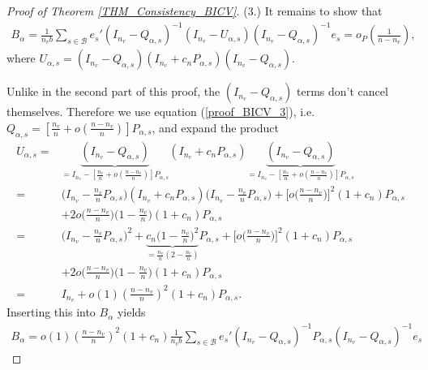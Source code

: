 \documentclass[Research_Module_ES.tex]{subfiles}
\begin{document}
\begin{proof}[Proof of Theorem \ref{THM_Consistency_BICV}]
	(3.) It remains to show that  
	\begin{align*}
	B_\alpha
	=\frac{1}{n_vb}\sum_{s\in \mathcal{B}}e_s'(I_{n_v}-Q_{\alpha,s})^{-1}(I_{n_v}-U_{\alpha,s})(I_{n_v}-Q_{\alpha,s})^{-1}e_s
	= o_P\left(\frac{1}{n-n_v}\right),
	\end{align*}
	where $U_{\alpha,s} = (I_{n_v}-Q_{\alpha,s})(I_{n_v}+c_n P_{\alpha,s})(I_{n_v}-Q_{\alpha,s})$.
	
	Unlike in the second part of this proof, the $(I_{n_v}-Q_{\alpha,s})$ terms don't cancel themselves. 
	Therefore we use equation (\ref{proof_BICV_3}), i.e. $Q_{\alpha,s} = \left[\frac{n_v}{n}+o\left(\frac{n-n_v}{n}\right)\right] P_{\alpha,s}$, and expand the product 
	\begin{align*}
	U_{\alpha,s} 
	=& \underbrace{(I_{n_v}-Q_{\alpha,s})}_{=I_{n_v}-[\frac{n_v}{n}+o(\frac{n-n_v}{n})]P_{\alpha,s}}(I_{n_v}+c_n P_{\alpha,s})\underbrace{(I_{n_v}-Q_{\alpha,s})}_{=I_{n_v}-[\frac{n_v}{n}+o(\frac{n-n_v}{n})]P_{\alpha,s}}\\
	=&\biggl(I_{n_v}-\frac{n_v}{n}P_{\alpha,s}\biggr)(I_{n_v}+c_n P_{\alpha,s})\biggl(I_{n_v}-\frac{n_v}{n}P_{\alpha,s}\biggr)
	+\biggl[o\biggl(\frac{n-n_v}{n}\biggr)\biggr]^2(1+c_n)P_{\alpha,s} \\
	&+ 2o\biggl(\frac{n-n_v}{n}\biggr)\biggl(1-\frac{n_v}{n}\biggr)(1+c_n)P_{\alpha,s}\\
	=&\biggl(I_{n_v}-\frac{n_v}{n}P_{\alpha,s}\biggr)^2+\underbrace{c_n\biggl(1-\frac{n_v}{n}\biggr)^2}_{=\frac{n_v}{n}(2-\frac{n_v}{n})}P_{\alpha,s}+\biggl[o\biggl(\frac{n-n_v}{n}\biggr)\biggr]^2(1+c_n)P_{\alpha,s}\\
	&+ 2o\biggl(\frac{n-n_v}{n}\biggr)\biggl(1-\frac{n_v}{n}\biggr)(1+c_n)P_{\alpha,s}\\
	=&I_{n_v} +o(1)\left(\frac{n-n_v}{n}\right)^2(1+c_n)P_{\alpha,s}.
	\end{align*}
	Inserting this into $B_\alpha$ yields
	\begin{align}
	B_\alpha
	=o(1)\left(\frac{n-n_v}{n}\right)^2(1+c_n)\frac{1}{n_vb}\sum_{s\in \mathcal{B}}e_s'(I_{n_v}-Q_{\alpha,s})^{-1}P_{\alpha,s}(I_{n_v}-Q_{\alpha,s})^{-1}e_s\label{proof_BICV_9}
	\end{align}

\end{proof}
\end{document}
